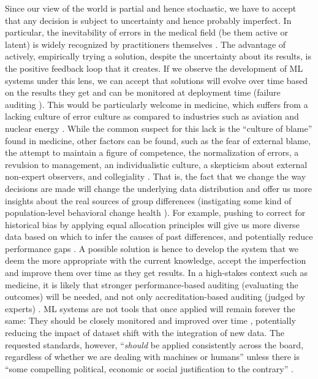     Since our view of the world is partial and hence stochastic, we have to accept that any decision is subject to uncertainty and hence probably imperfect.
    In particular, the inevitability of errors in the medical field (be them active or latent) is widely recognized by practitioners themselves \cite{Waring2005}.
    The advantage of actively, empirically trying a solution, despite the uncertainty about its results, is the positive feedback loop that it creates.
    If we observe the development of ML systems under this lens, we can accept that solutions will evolve over time based on the results they get and can be monitored at deployment time (failure auditing \cite{Chen2021}).
    This would be particularly welcome in medicine, which suffers from a lacking culture of error culture as compared to industries such as aviation and nuclear energy \cite{Waring2005}.
    While the common suspect for this lack is the ``culture of blame'' found in medicine, other factors can be found, such as the fear of external blame, the attempt to maintain a figure of competence, the normalization of errors, a revulsion to management, an individualistic culture, a skepticism about external non-expert observers, and collegiality \cite{Waring2005}.
    That is, the fact that we change the way decisions are made will change the underlying data distribution and offer us more insights about the real sources of group differences (instigating some kind of population-level behavioral change health \cite{Morley2020}).
    For example, pushing to correct for historical bias by applying equal allocation principles \cite{Rajkomar2018} will give us more diverse data based on which to infer the causes of past differences, and potentially reduce performance gaps \cite{Chen2021}.
    A possible solution is hence to develop the system that we deem the more appropriate with the current knowledge, accept the imperfection and improve them over time as they get results.
    In a high-stakes context such as medicine, it is likely that stronger performance-based auditing (evaluating the outcomes) will be needed, and not only accreditation-based auditing (judged by experts) \cite{Zerilli2019}.
    ML systems are not tools that once applied will remain forever the same: They should be closely monitored and improved over time \cite{Rajkomar2018}, potentially reducing the impact of dataset shift with the integration of new data.
    The requested standards, however, ``\emph{should} be applied consistently across the board, regardless of whether we are dealing with machines or humans'' unless there is ``some compelling political, economic or social justification to the contrary'' \cite[p.~678]{Zerilli2019}.

